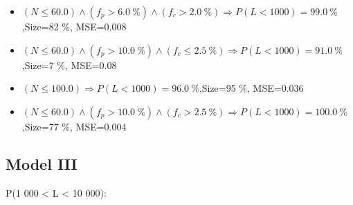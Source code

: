 \documentclass[numbered]{CSL}
\begin{document}
\begin{itemize}
\item $(N \leq 60.0) \land (f_p > 6.0~\%) \land (f_c > 2.0~\%) \Rightarrow P(L < 1 000) = 99.0~\%$,\hfill Size=82 \%, MSE=0.008
\item $(N \leq 60.0) \land (f_p > 10.0~\%) \land (f_c \leq 2.5~\%) \Rightarrow P(L < 1 000) = 91.0~\%$,\hfill Size=7 \%, MSE=0.08
\item $(N \leq 100.0) \Rightarrow P(L < 1 000) = 96.0~\%$,\hfill Size=95 \%, MSE=0.036
\item $(N \leq 60.0) \land (f_p > 10.0~\%) \land (f_c > 2.5~\%) \Rightarrow P(L < 1 000) = 100.0~\%$,\hfill Size=77 \%, MSE=0.004
\end{itemize}

\subsection{Model III}
P(1 000 < L < 10 000):
\end{document}
